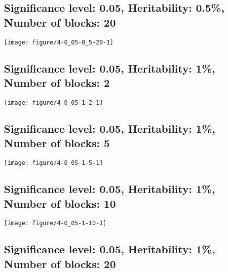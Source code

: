 \documentclass[11pt,letter]{article}\usepackage[]{graphicx}\usepackage[]{color}
\makeatletter
\def\maxwidth{ %
  \ifdim\Gin@nat@width>\linewidth
    \linewidth
  \else
    \Gin@nat@width
  \fi
}
\newenvironment{knitrout}{}{} %
\makeatother
\begin{document}
\newpage
\subsection{Significance level: 0.05, Heritability: 0.5\%, Number of blocks: 20}

\begin{knitrout}
\color{fgcolor}
\texttt{[image: figure/4-0\_05-0\_5-20-1]} 

\end{knitrout}

\newpage
\subsection{Significance level: 0.05, Heritability: 1\%, Number of blocks: 2}

\begin{knitrout}
\color{fgcolor}
\texttt{[image: figure/4-0\_05-1-2-1]} 

\end{knitrout}

\newpage
\subsection{Significance level: 0.05, Heritability: 1\%, Number of blocks: 5}

\begin{knitrout}
\color{fgcolor}
\texttt{[image: figure/4-0\_05-1-5-1]} 

\end{knitrout}

\newpage
\subsection{Significance level: 0.05, Heritability: 1\%, Number of blocks: 10}

\begin{knitrout}
\color{fgcolor}
\texttt{[image: figure/4-0\_05-1-10-1]} 

\end{knitrout}

\newpage
\subsection{Significance level: 0.05, Heritability: 1\%, Number of blocks: 20}
\end{document}
